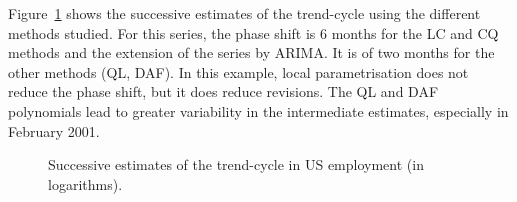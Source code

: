 \documentclass[
]{article}
\newcommand\1{\mathds{1}}
\begin{document}
Figure~\ref{fig-ce16ovlp} shows the successive estimates of the
trend-cycle using the different methods studied. For this series, the
phase shift is 6 months for the LC and CQ methods and the extension of
the series by ARIMA. It is of two months for the other methods (QL,
DAF). In this example, local parametrisation does not reduce the phase
shift, but it does reduce revisions. The QL and DAF polynomials lead to
greater variability in the intermediate estimates, especially in
February 2001.

\begin{figure}[H]

\caption{\label{fig-ce16ovlp}Successive estimates of the trend-cycle in
US employment (in logarithms).}


\end{figure}%
\end{document}

